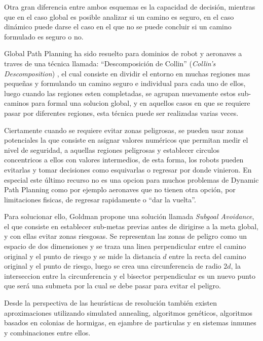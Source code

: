 Otra gran diferencia entre ambos esquemas es la capacidad de decisi\'on, mientras que en el caso global es posible analizar si un camino es seguro, en el caso din\'amico puede darse el caso en el que no se puede concluir si un camino formulado es seguro o no. \cite{Goldman94}

Global Path Planning ha sido resuelto para dominios de robot y aeronaves a traves de una t\'ecnica llamada: ``Descomposici\'on de Collin'' (\textit{Collin's Descomposition}) \cite{Latombe91}, el cual consiste en dividir el entorno en muchas regiones mas peque\~nas y formulando un camino seguro e individual para cada uno de ellos, luego cuando las regiones esten completadas, se agrupan nuevamente estos sub-caminos para formal una solucion global, y en aquellos casos en que se requiere pasar por diferentes regiones, esta t\'ecnica puede ser realizadas varias veces.\cite{Goldman94}

Ciertamente cuando se requiere evitar zonas peligrosas, se pueden usar zonas potenciales la que consiste en asignar valores num\'ericos que permitan medir el nivel de seguridad, a aquellas regiones peligrosas y establecer circulos concentricos a ellos con valores intermedios, de esta forma, los robots pueden evitarlas y tomar decisiones como esquivarlas o regresar por donde vinieron. En especial este \'ultimo recurso no es una opcion para muchos problemas de Dynamic Path Planning como por ejemplo aeronaves que no tienen otra opci\'on, por limitaciones fisicas, de regresar rapidamente o ``dar la vuelta''. 

Para solucionar ello, Goldman propone una soluci\'on llamada \textit{Subgoal Avoidance}, el que consiste en establecer sub-metas previas antes de dirigirse a la meta global, y con ellas evitar zonas riesgosas. Se representan las zonas de peligro como un espacio de dos dimensiones y se traza una linea perpendicular entre el camino original y el punto de riesgo y se mide la distancia $d$ entre la recta del camino original y el punto de riesgo, luego se crea una circunferencia de radio $2d$, la interseccion entre la circunferencia y el bisector perpendicular es un nuevo punto que ser\'a una submeta por la cual se debe pasar para evitar el peligro.\cite{Goldman94}


Desde la perspectiva de las heur\'isticas de resoluci\'on tambi\'en existen aproximaciones utilizando simulated annealing, algoritmos gen\'eticos, algoritmos basados en colonias de hormigas, en ejambre de particulas y en sistemas inmunes y combinaciones entre ellos.

